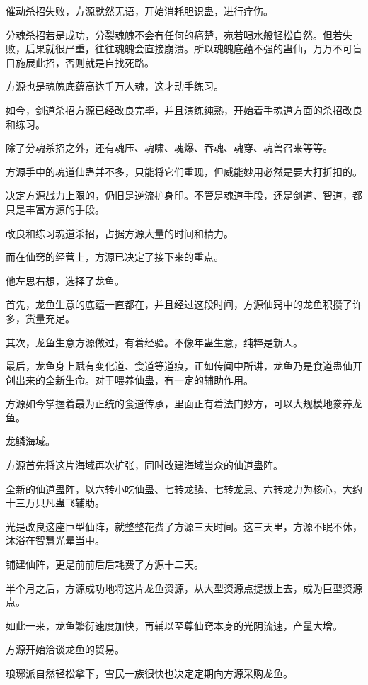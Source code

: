 \begin{this_body}
催动杀招失败，方源默然无语，开始消耗胆识蛊，进行疗伤。

分魂杀招若是成功，分裂魂魄不会有任何的痛楚，宛若喝水般轻松自然。但若失败，后果就很严重，往往魂魄会直接崩溃。所以魂魄底蕴不强的蛊仙，万万不可盲目施展此招，否则就是自找死路。

方源也是魂魄底蕴高达千万人魂，这才动手练习。

如今，剑道杀招方源已经改良完毕，并且演练纯熟，开始着手魂道方面的杀招改良和练习。

除了分魂杀招之外，还有魂压、魂啸、魂爆、吞魂、魂穿、魂兽召来等等。

方源手中的魂道仙蛊并不多，只能将它们重现，但威能妙用必然是要大打折扣的。

决定方源战力上限的，仍旧是逆流护身印。不管是魂道手段，还是剑道、智道，都只是丰富方源的手段。

改良和练习魂道杀招，占据方源大量的时间和精力。

而在仙窍的经营上，方源已决定了接下来的重点。

他左思右想，选择了龙鱼。

首先，龙鱼生意的底蕴一直都在，并且经过这段时间，方源仙窍中的龙鱼积攒了许多，货量充足。

其次，龙鱼生意方源做过，有着经验。不像年蛊生意，纯粹是新人。

最后，龙鱼身上赋有变化道、食道等道痕，正如传闻中所讲，龙鱼乃是食道蛊仙开创出来的全新生命。对于喂养仙蛊，有一定的辅助作用。

方源如今掌握着最为正统的食道传承，里面正有着法门妙方，可以大规模地豢养龙鱼。

龙鳞海域。

方源首先将这片海域再次扩张，同时改建海域当众的仙道蛊阵。

全新的仙道蛊阵，以六转小吃仙蛊、七转龙鳞、七转龙息、六转龙力为核心，大约十三万只凡蛊飞辅助。

光是改良这座巨型仙阵，就整整花费了方源三天时间。这三天里，方源不眠不休，沐浴在智慧光晕当中。

铺建仙阵，更是前前后后耗费了方源十二天。

半个月之后，方源成功地将这片龙鱼资源，从大型资源点提拔上去，成为巨型资源点。

如此一来，龙鱼繁衍速度加快，再辅以至尊仙窍本身的光阴流速，产量大增。

方源开始洽谈龙鱼的贸易。

琅琊派自然轻松拿下，雪民一族很快也决定定期向方源采购龙鱼。


\end{this_body}
